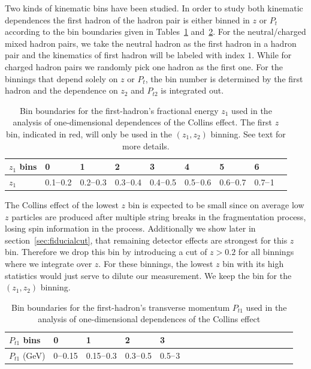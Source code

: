 Two kinds of kinematic bins have been studied. In order to study both kinematic dependences the first hadron of the hadron pair is either binned in $z$ or $P_t$ according to the bin boundaries given in Tables~\ref{tab:whatissinglez} and~\ref{tab:whatissinglept}. For the neutral/charged mixed hadron pairs, we take the neutral hadron as the first hadron in a hadron pair and the kinematics of first hadron will be labeled with index $1$. While for charged hadron pairs we randomly pick one hadron as the first one. For the binnings that depend solely on $z$ or $P_t$, the bin number is determined by the first hadron and the dependence on $z_2$ and $P_{t2}$ is integrated out. 
\begin{table}[H]\small
\centering
\begin{tabular}{|l|l|l|l|l|l|l|l|l|}
\hline
$z_1$ bins & 0 &  1 & 2 & 3 & 4 & 5 & 6  \\ \hline
 $z_1$  & {\color{red}0.1$\textup{--}$0.2} & 0.2$\textup{--}$0.3 & 0.3$\textup{--}$0.4 & 0.4$\textup{--}$0.5 & 0.5$\textup{--}$0.6 & 0.6$\textup{--}$0.7 & 0.7$\textup{--}$1  \\ \hline
\end{tabular}
\caption{Bin boundaries for the first-hadron's fractional energy $z_1$ used in the analysis of one-dimensional dependences of the Collins effect. The first $z$ bin, indicated in red, will only be used in the $(z_1,z_2)$  binning. See text for more details.}
\label{tab:whatissinglez}
\end{table}
The Collins effect of the lowest $z$ bin is expected to be small since on average low $z$ particles are produced after multiple string breaks in the fragmentation process, losing spin information in the process. Additionally we show later in section~\ref{sec:fiducialcut}, that remaining detector effects are strongest for this $z$ bin. Therefore we drop this bin by introducing a cut of $z>0.2$ for all binnings where we integrate over $z$. For these binnings, the lowest $z$ bin with its high statistics would just serve to dilute our measurement. We keep the bin for the $(z_1,z_2)$ binning.


\begin{table}[H]\small
\centering
\begin{tabular}{|l|l|l|l|l|l|l|l|l|l|l|l|l|l|l|l|l|l|}
\hline
 $P_{t1}$ bins & 0 &  1 & 2 & 3   \\ \hline
 $P_{t1}$ (GeV)  & 0$\textup{--}$0.15& 0.15$\textup{--}$0.3 & 0.3$\textup{--}$0.5 & 0.5$\textup{--}$3  \\ \hline
\end{tabular}
\caption{Bin boundaries for the first-hadron's transverse momentum $P_{t1}$ used in the analysis of one-dimensional dependences of the Collins effect}
\label{tab:whatissinglept}
\end{table}

